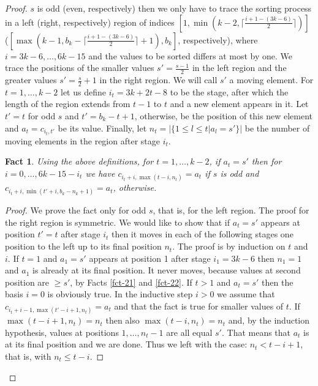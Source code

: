 \documentclass{llncs}
\newtheorem{fact}[theorem]{Fact}
\begin{document}
\begin{proof}
$s$ is odd (even, respectively) then we only have to trace the sorting process
in a left (right, respectively) region of indices
$[1,\min(k-2,\lceil\frac{i+1-(3k-6)}{2}\rceil)]$
($[\max(k-1,b_k-\lceil\frac{i+1-(3k-6)}{2}\rceil+1),b_k]$, respectively),
where $i = 3k-6, \ldots, 6k-15$ and the values to be sorted differs at most by
one. We trace the positions of the smaller values $s'=\frac{s-1}{2}$ in the
left region and the greater values $s'=\frac{s}{2}+1$ in the right region. We
will call $s'$ a moving element. For $t = 1, \ldots, k-2$ let us define $i_t =
3k+2t-8$ to be the stage, after which the length of the region extends from
$t-1$ to $t$ and a new element appears in it. Let $t'=t$ for odd $s$ and
$t'=b_k-t+1$, otherwise, be the position of this new element and
$a_t=c_{i_t,t'}$ be its value. Finally, let $n_t = |\{1\le l\le t | a_l =
s'\}|$ be the number of moving elements in the region after stage $i_t$.
\begin{fact}\label{fct-23}
Using the above definitions, for $t = 1, \ldots, k-2$, if $a_t = s'$ then for $i
= 0, \ldots, 6k - 15 - i_t$ we have $c_{i_t+i,\max(t-i,n_t)} = a_t$ if $s$ is 
odd and $c_{i_t+i,\min(t'+i,b_k-n_k+1)} = a_t$, otherwise.
\end{fact}
\begin{proof}
We prove the fact only for odd $s$, that is, for the left region. The proof
for the right region is symmetric. We would like to show that if $a_t = s'$
appears at position $t' = t$ after stage $i_t$ then it moves in each of the
following stages one position to the left up to its final position $n_t$. The
proof is by induction on $t$ and $i$. If $t=1$ and $a_1=s'$ appears at
position 1 after stage $i_1=3k-6$ then $n_1=1$ and $a_1$ is already at its
final position. It never moves, because values at second position are $\ge
s'$, by Facts \ref{fct-21} and \ref{fct-22}. If $t>1$ and $a_t = s'$ then the
basis $i=0$ is obviously true. In the inductive step $i>0$ we assume that 
$c_{i_t+i-1,\max(t'-i+1,n_t)} = a_t$ and that the fact is true for smaller 
values of $t$. If $\max(t-i+1,n_t) = n_t$ then also $\max(t-i,n_t) = n_t$ 
and, by the induction hypothesis, values at positions $1, \ldots, n_t-1$ 
are all equal $s'$. That means that $a_t$ is at its final position and we are 
done. Thus we left with the case: $n_t < t-i+1$, that is, with $n_t \le t-i$. 


\end{proof}
\end{proof}
\end{document}
